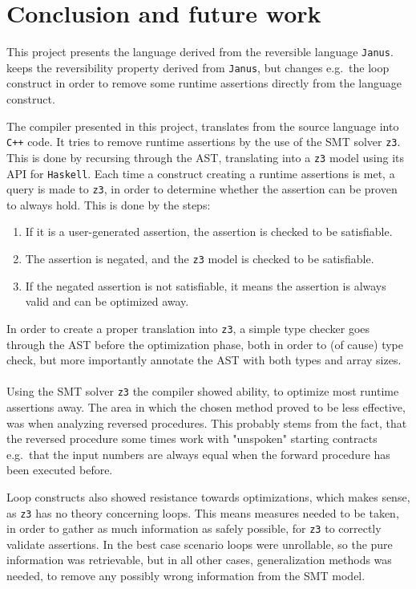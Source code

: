 \section{Conclusion and future work }
This project presents the language \lan derived from the reversible language \texttt{Janus}.
\lan keeps the reversibility property derived from \texttt{Janus}, but changes e.g.\ the loop
construct in order to remove some runtime assertions directly from the language construct.

The \lan compiler presented in this project, translates from the source language into \texttt{C++}
code. It tries to remove runtime assertions by the use of the SMT solver \texttt{z3}. This is
done by recursing through the AST, translating into a \texttt{z3} model using its API for
\texttt{Haskell}. Each time a construct creating a runtime assertions is met, a query is made to
\texttt{z3}, in order to determine whether the assertion can be proven to always hold. This is
done by the steps:
\begin{enumerate}
      \item If it is a user-generated assertion, the assertion is checked to be satisfiable.
      \item The assertion is negated, and the \texttt{z3} model is checked to be satisfiable.
      \item If the negated assertion is not satisfiable, it means the assertion is always valid
            and can be optimized away.
\end{enumerate}
\noindent
In order to create a proper translation into \texttt{z3}, a simple type checker goes through the
AST before the optimization phase, both in order to (of cause) type check, but more importantly
annotate the AST with both types and array sizes.
\\
\\
Using the SMT solver \texttt{z3} the \lan compiler showed ability, to optimize most runtime
assertions away. The area in which the chosen method proved to be less effective, was when
analyzing reversed procedures. This probably stems from the fact, that the reversed procedure
some times work with "unspoken" starting contracts e.g.\ that the input numbers are always equal
when the forward procedure has been executed before.

Loop constructs also showed resistance towards optimizations, which makes sense, as \texttt{z3}
has no theory concerning loops. This means measures needed to be taken, in order to gather as much
information as safely possible, for \texttt{z3} to correctly validate assertions. In the best case
scenario loops were unrollable, so the pure information was retrievable, but in all other
cases, generalization methods was needed, to remove any possibly wrong information from the
SMT model.

